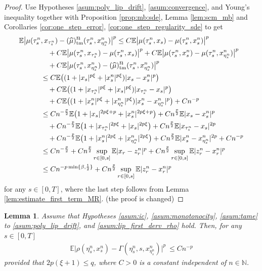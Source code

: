 \documentclass[reqno,  oneside, 12pt]{amsart}
\newtheorem{lemma}{Lemma}[section]
\newcommand{\E}{\mathbb E}
\begin{document}
\begin{proof}
	
	Use Hypotheses \ref{asum:poly_lip_drift}, \ref{asum:convergence}, and Young's inequality together with  Proposition \ref{prop:mb:sde}, Lemma \ref{lem:scm_mb}  and Corollaries \ref{cor:one_step_error}, \ref{cor:one_step_regularity_sde} to get 
	\begin{align}
		\E\big|\mu(\tau_s^n&,x_{\tau^n_s})-(\widehat {\mu})_{\mathrm{tm}}^{\displaystyle n}(\tau_s^n,x_{\eta^n_s}^{n})\big|^p
		\leq C	\E\big|\mu(\tau_s^n,x_{s})-{\mu}(\tau_s^n,x_{s}^{n})\big|^p\notag
		\\
		&\quad+C	\E\big|\mu(\tau_s^n,x_{\tau^n_s})-{\mu}(\tau_s^n,x_{s})\big|^p+C	\E\big|\mu(\tau_s^n,x_{s}^n)-{\mu}(\tau_s^n,x_{\eta^n_s}^{n})\big|^p\notag
		\\
		&\quad+C\E\big|\mu(\tau_s^n,x_{\eta^n_s}^n)-(\widehat {\mu})_{\mathrm{tm}}^{\displaystyle n}(\tau_s^n,x_{\eta^n_s}^{n})\big|^p\notag
		\\
		&\leq 	C\E\big((1+|x_{s}|^{p\xi}+|x_{s}^n|^{p \xi})|x_{s}-x_{s}^n|^{p}\big) \notag
		\\
		&\quad+C\E\big((1+|x_{\tau^n_s}|^{p\xi}+|x_{s}|^{p \xi})|x_{\tau^n_s}-x_{s}|^{p}\big) \notag
		\\
		&\quad+C\E\big((1+|x_{s}^n|^{p\xi}+|x_{\eta^n_s}^n|^{p \xi})|x_{s}^n-x_{\eta^n_s}^n|^{p}\big) +Cn^{-p} \notag
		\\
		&\leq 	Cn^{-\frac{p}{2}}\E\big(1+|x_{s}|^{2p\xi+p}+|x_{s}^n|^{2p\xi+p}\big)+Cn^{\frac{p}{2}}\E|x_{s}-x_{s}^n|^{p} \notag
		\\
		&\quad+Cn^{-\frac{p}{2}}\E\big(1+|x_{\tau^n_s}|^{2p\xi}+|x_{s}|^{2p\xi}\big)+Cn^{\frac{p}{2}}\E|x_{\tau^n_s}-x_{s}|^{2p} \notag
		\\
		&\quad+Cn^{-\frac{p}{2}}\E\big(1+|x_{s}^n|^{2p\xi}+|x_{\eta^n_s}^n|^{2p\xi}\big)+Cn^{\frac{p}{2}}\E|x_{s}^n-x_{\eta^n_s}^n|^{2p}  +Cn^{-p} \notag
		\\
		&\leq  Cn^{-\frac{p}{2}}+ Cn^{\frac{p}{2}}\sup_{ r\in[0,s]}\E|x_r-z_r^n|^p + Cn^{\frac{p}{2}}\sup_{ r\in[0,s]}\E|z_r^n-x_r^n|^p \notag
		\\
		&\leq  Cn^{-p\min\{\beta,\frac{1}{2}\}}+ Cn^{\frac{p}{2}}\sup_{ r\in[0,s]}\E|z_r^n-x_r^n|^p  \notag
	\end{align}
	for any $s\in[0,T]$, where the last step follows	from Lemma \ref{lem:estimate_first_term_MR}. {(the proof is changed)}
\end{proof}
\begin{lemma}\label{lem:rho}
	Assume that Hypotheses \mbox{\normalfont  \ref{asum:ic}},  \mbox{\normalfont  \ref{asum:monotonocity}},  \mbox{\normalfont  \ref{asum:tame}} to  \mbox{\normalfont  \ref{asum:poly_lip_drift}}, and \textnormal{\ref{asum:lip_first_derv_rho}} hold. Then, for any $s \in [0, T]$
	\begin{align*}
		\E\big|\rho(\eta^n_s, x_{s}^n)-  \Gamma(\eta^n_s,s,x_{\eta^n_s}^{n})\big|^{p} \ \leq  Cn^{-p}
	\end{align*}
	provided that $2p(\xi+1)\leq q$,	where $C>0$    is a constant independent of  $n\in \mathbb N$. 
\end{lemma}
\end{document}
